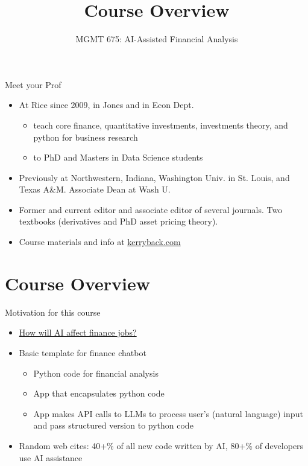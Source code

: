 \documentclass[10pt]{beamer}
\title{Course Overview}
\subtitle{MGMT 675: AI-Assisted Financial Analysis}
\date{}
\begin{document}
\begin{frame}[plain]
\titlepage
\end{frame}

\begin{frame}{Meet your Prof}
\begin{itemize}
\item At Rice since 2009, in Jones and in Econ Dept.
  \begin{itemize}
  \item teach core finance, quantitative investments, investments theory, and python for business research
  \item to PhD and Masters in Data Science students
  \end{itemize}
\item Previously at Northwestern, Indiana, Washington Univ. in St. Louis, and Texas A\&M. Associate Dean at Wash U.
\item Former and current editor and associate editor of several journals. Two textbooks (derivatives and PhD asset pricing theory). 
\item Course materials and info at \href{https://kerryback.com}{kerryback.com}
\end{itemize}
\end{frame}

\section{Course Overview}

\begin{frame}{Motivation for this course}
\begin{itemize}
\item \href{https://www.cio.com/article/2089550/ai-poised-to-replace-entry-level-positions-at-large-financial-institutions.html}{How will AI affect finance jobs?}

\item Basic template for finance chatbot
  \begin{itemize}
  \item Python code for financial analysis
  \item App that encapsulates python code
  \item App makes API calls to LLMs to process user's (natural language) input and pass structured version to python code
  \end{itemize}

\item Random web cites: 40+\% of all new code written by AI, 80+\% of developers use AI assistance
\end{itemize}
\end{frame}
\end{document}
